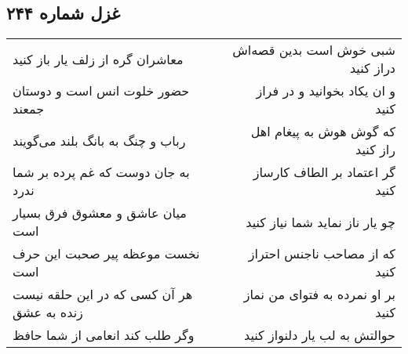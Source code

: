 \begin{center}
\section*{غزل شماره ۲۴۴}
\label{sec:sh244}
\begin{longtable}{l p{0.5cm} r}
معاشران گره از زلف یار باز کنید
&&
شبی خوش است بدین قصه‌اش دراز کنید
\\
حضور خلوت انس است و دوستان جمعند
&&
و ان یکاد بخوانید و در فراز کنید
\\
رباب و چنگ به بانگ بلند می‌گویند
&&
که گوش هوش به پیغام اهل راز کنید
\\
به جان دوست که غم پرده بر شما ندرد
&&
گر اعتماد بر الطاف کارساز کنید
\\
میان عاشق و معشوق فرق بسیار است
&&
چو یار ناز نماید شما نیاز کنید
\\
نخست موعظه پیر صحبت این حرف است
&&
که از مصاحب ناجنس احتراز کنید
\\
هر آن کسی که در این حلقه نیست زنده به عشق
&&
بر او نمرده به فتوای من نماز کنید
\\
وگر طلب کند انعامی از شما حافظ
&&
حوالتش به لب یار دلنواز کنید
\\
\end{longtable}
\end{center}
